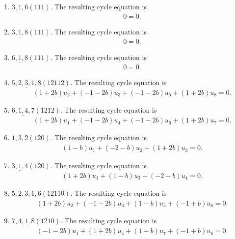 \documentclass[11pt]{article}
\begin{document}
\begin{enumerate}[label=(\arabic*)]
\item $ \underline{3,1,6}(111) $.  The resulting cycle equation is
\[
\begin{aligned}
&0=0.
\end{aligned}
\]
\item $ \underline{3,1,8}(111) $.  The resulting cycle equation is
\[
\begin{aligned}
&0=0.
\end{aligned}
\]
\item $ \underline{6,1,8}(111) $.  The resulting cycle equation is
\[
\begin{aligned}
&0=0.
\end{aligned}
\]
\item $ \underline{5,2,3,1,8}(12112) $.  The resulting cycle equation is
\[
\begin{aligned}
&\left(1 + 2b\right)u_{2} + \left(-1 - 2b\right)u_{3} + \left(-1 - 2b\right)u_{5} + \left(1 + 2b\right)u_{8}=0.
\end{aligned}
\]
\item $ \underline{6,1,4,7}(1212) $.  The resulting cycle equation is
\[
\begin{aligned}
&\left(1 + 2b\right)u_{1} + \left(-1 - 2b\right)u_{4} + \left(-1 - 2b\right)u_{6} + \left(1 + 2b\right)u_{7}=0.
\end{aligned}
\]
\item $ \underline{1,3,2}(120) $.  The resulting cycle equation is
\[
\begin{aligned}
&\left(1 - b\right)u_{1} + \left(-2 - b\right)u_{2} + \left(1 + 2b\right)u_{3}=0.
\end{aligned}
\]
\item $ \underline{3,1,4}(120) $.  The resulting cycle equation is
\[
\begin{aligned}
&\left(1 + 2b\right)u_{1} + \left(1 - b\right)u_{3} + \left(-2 - b\right)u_{4}=0.
\end{aligned}
\]
\item $ \underline{5,2,3,1,6}(12110) $.  The resulting cycle equation is
\[
\begin{aligned}
&\left(1 + 2b\right)u_{2} + \left(-1 - 2b\right)u_{3} + \left(1 - b\right)u_{5} + \left(-1 + b\right)u_{6}=0.
\end{aligned}
\]
\item $ \underline{7,4,1,8}(1210) $.  The resulting cycle equation is
\[
\begin{aligned}
&\left(-1 - 2b\right)u_{1} + \left(1 + 2b\right)u_{4} + \left(1 - b\right)u_{7} + \left(-1 + b\right)u_{8}=0.
\end{aligned}
\]
\end{enumerate}
\end{document}

